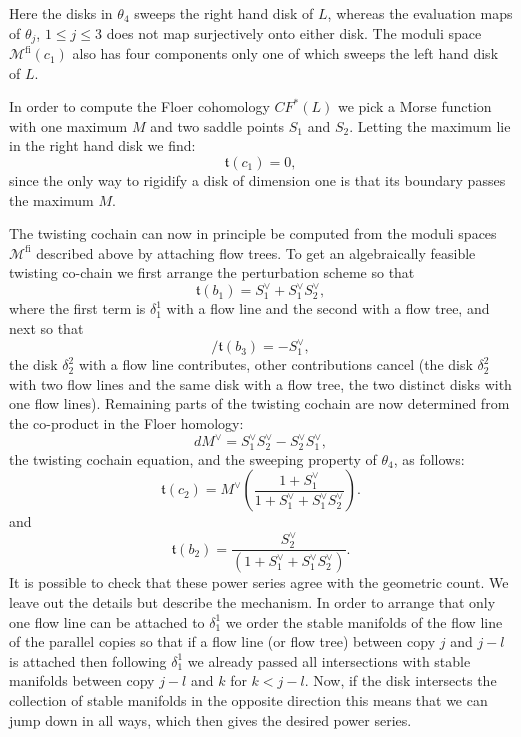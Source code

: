 \documentclass{gtpart}
\renewcommand{\t}{\mathfrak{t}}
\newcommand{\fl}{\mathrm{fi}}
\begin{document}
Here the disks in $\theta_{4}$ sweeps the right hand disk of $L$, whereas the evaluation maps of
$\theta_{j}$, $1\le j\le 3$ does not map surjectively onto either disk. The moduli space
$\mathcal{M}^{\fl}(c_{1})$ also has four components only one of which sweeps the left hand disk of $L$.

In order to compute the Floer cohomology $CF^{\ast}(L)$ we pick a Morse function with one maximum $M$ and two saddle points $S_{1}$ and $S_{2}$. Letting the maximum lie in the right hand disk we find:
\[ 
\t(c_{1})=0,
\]
since the only way to rigidify a disk of dimension one is that its boundary passes the maximum $M$.

The twisting cochain can now in principle be computed from the moduli spaces $\mathcal{M}^{\fl}$ described above by attaching flow trees. To get an algebraically feasible twisting co-chain we first arrange the perturbation scheme so that 
\[ 
\t(b_{1})= S_{1}^{\vee}+S_{1}^{\vee}S_{2}^{\vee},
\] 
where the first term is $\delta_{1}^{1}$ with a flow line and the second with a flow tree, and next so that
\[ 
/\t(b_{3})= -S_{1}^{\vee},
\] 
the disk $\delta_{2}^{2}$ with a flow line contributes, other contributions cancel (the disk $\delta_{2}^{2}$ with two flow lines and the same disk with a flow tree, the two distinct disks with one flow lines). Remaining parts of the twisting cochain are now determined from the co-product in the Floer homology:
\[ 
dM^{\vee}= S_{1}^{\vee}S_{2}^{\vee}-S_{2}^{\vee}S_{1}^{\vee},
\]
the twisting cochain equation, and the sweeping property of $\theta_{4}$, as follows: 
\[ 
\t(c_{2})=M^{\vee}\left(\frac{1+S_{1}^{\vee}}{1+S_{1}^{\vee}+S_{1}^{\vee}S_{2}^{\vee}}\right) .
\] 
and
\[ 
\t(b_{2})= \frac{S_{2}^{\vee}}{(1+S_1^{\vee}+S_{1}^{\vee}S_{2}^{\vee})}.
\]
It is possible to check that these power series agree with the geometric count. We leave out the
details but describe the mechanism. In order to arrange that only one flow line can be attached to
$\delta_{1}^{1}$ we order the stable manifolds of the flow line of the parallel copies so that if a
flow line (or flow tree) between copy $j$ and $j-l$ is attached then following $\delta_{1}^{1}$ we already passed all intersections with stable manifolds between copy $j-l$ and $k$ for $k<j-l$. Now, if the disk intersects the collection of stable manifolds in the opposite direction this means that we can jump down in all ways, which then gives the desired power series. 
\end{document}
